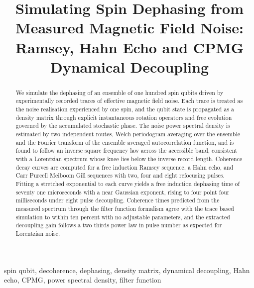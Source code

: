 \documentclass[conference]{IEEEtran}
\begin{document}
\title{Simulating Spin Dephasing from Measured Magnetic Field Noise:\\
Ramsey, Hahn Echo and CPMG Dynamical Decoupling}

\author{
}

\maketitle

\begin{abstract}
We simulate the dephasing of an ensemble of one hundred spin qubits driven by
experimentally recorded traces of effective magnetic field noise. Each trace is
treated as the noise realisation experienced by one spin, and the qubit state is
propagated as a density matrix through explicit instantaneous rotation operators
and free evolution governed by the accumulated stochastic phase. The noise power
spectral density is estimated by two independent routes, Welch periodogram
averaging over the ensemble and the Fourier transform of the ensemble averaged
autocorrelation function, and is found to follow an inverse square frequency law
across the accessible band, consistent with a Lorentzian spectrum whose knee lies
below the inverse record length. Coherence decay curves are computed for a free
induction Ramsey sequence, a Hahn echo, and Carr Purcell Meiboom Gill sequences
with two, four and eight refocusing pulses. Fitting a stretched exponential to
each curve yields a free induction dephasing time of seventy one microseconds
with a near Gaussian exponent, rising to four point four milliseconds under eight
pulse decoupling. Coherence times predicted from the measured spectrum through
the filter function formalism agree with the trace based simulation to within ten
percent with no adjustable parameters, and the extracted decoupling gain follows a
two thirds power law in pulse number as expected for Lorentzian noise.
\end{abstract}

\begin{IEEEkeywords}
spin qubit, decoherence, dephasing, density matrix, dynamical decoupling, Hahn
echo, CPMG, power spectral density, filter function
\end{IEEEkeywords}
\end{document}
